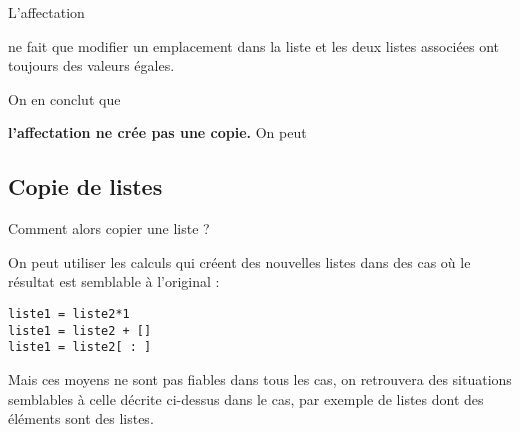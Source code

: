 \begin{minipage}{0.40\textwidth}
\vspace{0pt}
L'affectation  

ne fait que modifier un emplacement dans la liste et les deux listes associées ont toujours des valeurs égales.

On en conclut que 

{\bf l'affectation  ne crée pas une copie.}
On peut 
\end{minipage}
\begin{minipage}{0.60\textwidth}
\vspace{0pt}
\begin{center}
\end{center}
\end{minipage}
\subsection{Copie de listes}
Comment alors copier une liste ?

On peut utiliser les calculs qui créent des nouvelles listes dans des cas où le résultat est semblable à l'original :
\begin{lstlisting}
liste1 = liste2*1
liste1 = liste2 + []
liste1 = liste2[ : ]
\end{lstlisting}
Mais ces moyens ne sont pas fiables dans tous les cas, on retrouvera des situations semblables à celle décrite ci-dessus dans le cas, par exemple de listes dont des éléments sont des listes.

